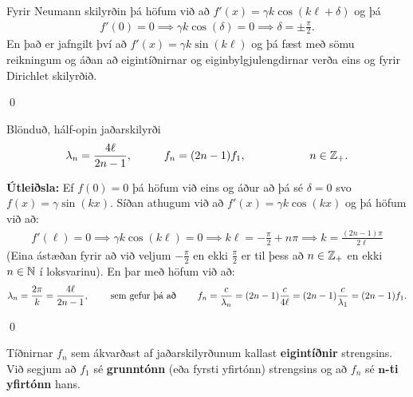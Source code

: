\ifdefined \wholebook \else\documentclass[oneside]{book}\usepackage{EdlBook}\graphicspath{{figures/}}
\begin{document}
Fyrir Neumann skilyrðin þá höfum við að $f'(x) = \gamma k \cos(k\ell + \delta)$ og þá
\begin{align*}
    f'(0) = 0 \implies \gamma k \cos(\delta) = 0 \implies \delta = \pm \frac{\pi}{2}. 
\end{align*}
En það er jafngilt því að $f'(x) = \gamma k \sin(k\ell)$ og þá fæst með sömu reikningum og áðan að eigintíðnirnar og eiginbylgjulengdirnar verða eins og fyrir Dirichlet skilyrðið.

\qed

\begin{tcolorbox}
\begin{theorem}
Blönduð, hálf-opin jaðarskilyrði
\begin{align*}
    \lambda_n = \frac{4\ell}{2n-1}, \hspace{1cm} f_n = (2n-1)f_1, \hspace{2cm} n \in \mathbb{Z}_+.
\end{align*}
\end{theorem}
\end{tcolorbox}

\textbf{Útleiðsla:} Ef $f(0) = 0$ þá höfum við eins og áður að þá sé $\delta = 0$ svo $f(x) = \gamma \sin(kx)$. Síðan athugum við að $f'(x) = \gamma k \cos(kx)$ og þá höfum við að:
\begin{align*}
    f'(\ell) = 0 \implies \gamma k \cos(k\ell) = 0 \implies k \ell = -\frac{\pi}{2} + n\pi \implies k = \frac{(2n-1)\pi}{2\ell}
\end{align*}
(Eina ástæðan fyrir að við veljum $-\frac{\pi}{2}$ en ekki $\frac{\pi}{2}$ er til þess að $n \in \mathbb{Z}_+$ en ekki $n \in \mathbb{N}$ í loksvarinu). En þar með höfum við að:
\begin{align*}
    \lambda_n = \frac{2\pi}{k} = \frac{4\ell}{2n-1}, \hspace{0.8cm} \text{sem gefur þá að} \hspace{0.8cm} f_n = \frac{c}{\lambda_n} = (2n-1) \frac{c}{4\ell} = (2n-1) \frac{c}{\lambda_1} = (2n-1)f_1.
\end{align*}

\qed

\begin{tcolorbox}
\begin{definition}
Tíðnirnar $f_n$ sem ákvarðast af jaðarskilyrðunum kallast \textbf{eigintíðnir} strengsins. Við segjum að $f_1$ sé \textbf{grunntónn} (eða fyrsti yfirtónn) strengsins og að $f_n$ sé \textbf{$\bm{n}$-ti yfirtónn} hans.
\end{definition}
\end{tcolorbox}
\end{document}
